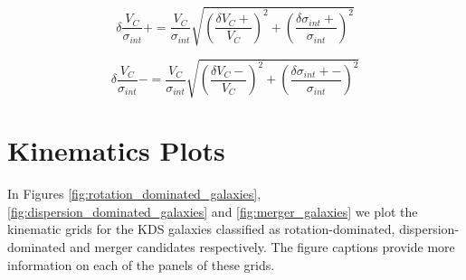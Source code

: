 \documentclass[fleqn,usenatbib]{mn2e}
\begin{document}
\begin{equation}\label{eq:v_over_sig_plus}
   \delta\frac{V_{C}}{\sigma_{int}}+ = \frac{V_{C}}{\sigma_{int}}\sqrt{\left(\frac{\delta V_{C}+}{V_{C}}\right)^{2} + \left(\frac{\delta\sigma_{int}+}{\sigma_{int}}\right)^{2}}
\end{equation}

\begin{equation}\label{eq:v_over_sig_minus}
   \delta\frac{V_{C}}{\sigma_{int}}- = \frac{V_{C}}{\sigma_{int}}\sqrt{\left(\frac{\delta V_{C}-}{V_{C}}\right)^{2} + \left(\frac{\delta\sigma_{int}+-}{\sigma_{int}}\right)^{2}}
\end{equation}

\section{Kinematics Plots}\label{app:kinematics_plots}
In Figures \ref{fig:rotation_dominated_galaxies}, \ref{fig:dispersion_dominated_galaxies} and \ref{fig:merger_galaxies} we plot the kinematic grids for the KDS galaxies classified as rotation-dominated, dispersion-dominated and merger candidates respectively.
The figure captions provide more information on each of the panels of these grids.
\end{document}
